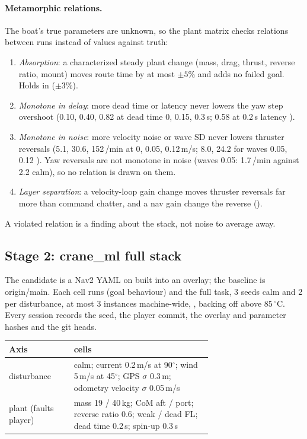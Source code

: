 \paragraph{Metamorphic relations.} The boat's true parameters are unknown, so the plant matrix
checks relations between runs instead of values against truth:
\begin{enumerate}[leftmargin=*, itemsep=1pt]
\item \emph{Absorption}: a characterized steady plant change (mass, drag, thrust, reverse ratio,
  mount) moves route time by at most $\pm5\%$ and adds no failed goal. Holds in 
  ($\pm3\%$).
\item \emph{Monotone in delay}: more dead time or latency never lowers the yaw step overshoot
  (0.10, 0.40, 0.82 at dead time 0, 0.15, 0.3\,s; 0.58 at 0.2\,s latency ).
\item \emph{Monotone in noise}: more velocity noise or wave SD never lowers thruster reversals
  (5.1, 30.6, 152\,/min at 0, 0.05, 0.12\,m/s; 8.0, 24.2 for waves 0.05, 0.12 ).
  Yaw reversals are not monotone in noise (waves 0.05: 1.7\,/min against 2.2 calm), so no relation
  is drawn on them.
\item \emph{Layer separation}: a velocity-loop gain change moves thruster reversals far more than
  command chatter, and a nav gain change the reverse ().
\end{enumerate}
A violated relation is a finding about the stack, not noise to average away.

\subsection{Stage 2: crane\_ml full stack}
The candidate is a Nav2 YAML on  built into an overlay; the baseline is
origin/main. Each cell runs  (goal behaviour) and the full  task, 3
seeds calm and 2 per disturbance, at most 3 instances machine-wide, , backing
off above 85\,$^\circ$C. Every session records the seed, the player commit, the overlay and
parameter hashes and the git heads.

\begin{center}\small
\begin{tabular}{@{}lp{0.68\linewidth}@{}}
\toprule
Axis & cells \\
\midrule
disturbance & calm; current 0.2\,m/s at 90$^\circ$; wind 5\,m/s at 45$^\circ$; GPS $\sigma$ 0.3\,m; odometry velocity $\sigma$ 0.05\,m/s \\
plant (faults player) & mass 19 / 40\,kg; CoM aft / port; reverse ratio 0.6; weak / dead FL; dead time 0.2\,s; spin-up 0.3\,s \\
\bottomrule
\end{tabular}
\end{center}

